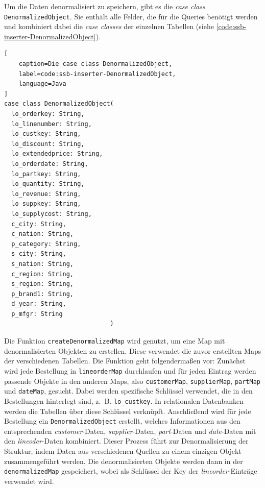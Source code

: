 Um die Daten denormalisiert zu speichern, gibt es die \emph{case class} \lstinline|DenormalizedObject|. Sie enthält alle Felder, die für die Queries benötigt werden und kombiniert dabei die \emph{case classes} der einzelnen Tabellen (siehe \cref{code:ssb-inserter-DenormalizedObject}).

\begin{lstlisting}[
    caption=Die case class DenormalizedObject,
    label=code:ssb-inserter-DenormalizedObject,
    language=Java
]
case class DenormalizedObject(
  lo_orderkey: String,
  lo_linenumber: String,
  lo_custkey: String,
  lo_discount: String,
  lo_extendedprice: String,
  lo_orderdate: String,
  lo_partkey: String,
  lo_quantity: String,
  lo_revenue: String,
  lo_suppkey: String,
  lo_supplycost: String,
  c_city: String,
  c_nation: String,
  p_category: String,
  s_city: String,
  s_nation: String,
  c_region: String,
  s_region: String,
  p_brand1: String,
  d_year: String,
  p_mfgr: String
							 )
\end{lstlisting}



Die Funktion \lstinline|createDenormalizedMap| wird genutzt, um eine Map mit denormalisierten Objekten zu erstellen. Diese verwendet die zuvor erstellten Maps der verschiedenen Tabellen. Die Funktion geht folgendermaßen vor: Zunächst wird jede Bestellung in \lstinline|lineorderMap| durchlaufen und für jeden Eintrag werden passende Objekte in den anderen Maps, also  \lstinline|customerMap|, \lstinline|supplierMap|, \lstinline|partMap| und \lstinline|dateMap|, gesucht. Dabei werden spezifische Schlüssel verwendet, die in den Bestellungen hinterlegt sind, z.~B. \lstinline|lo_custkey|. In relationalen Datenbanken werden die Tabellen über diese Schlüssel verknüpft. Anschließend wird für jede Bestellung ein \lstinline|DenormalizedObject| erstellt, welches Informationen aus den entsprechenden \emph{customer}-Daten, \emph{supplier}-Daten, \emph{part}-Daten und \emph{date}-Daten mit den \emph{lineoder}-Daten kombiniert. Dieser Prozess führt zur Denormalisierung der Struktur, indem Daten aus verschiedenen Quellen zu einem einzigen Objekt zusammengeführt werden. Die denormalisierten Objekte werden dann in der \lstinline|denormalizedMap| gespeichert, wobei als Schlüssel der Key der \emph{lineorder}-Einträge verwendet wird.

